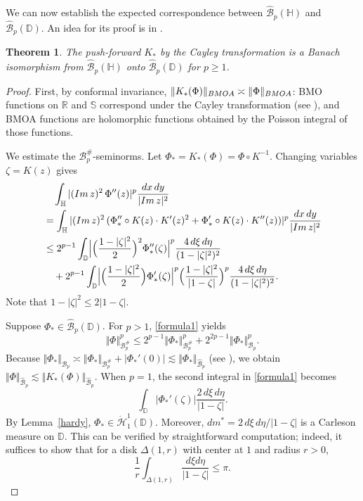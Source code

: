 \documentclass[amstex,12pt,reqno]{amsart}
\newtheorem{theorem}{Theorem}[section]
\theoremstyle{definition}
\begin{document}
We can now establish the expected correspondence between $\widehat{\mathcal B}_p(\mathbb H)$ and 
$\widehat{\mathcal B}_p(\mathbb D)$. An idea for its proof is in \cite[Section 9]{Pe}.

\begin{theorem}\label{isomorphism}
The push-forward $K_*$ by the Cayley transformation is a Banach isomorphism from $\widehat{\mathcal B}_p(\mathbb H)$ onto 
$\widehat{\mathcal B}_p(\mathbb D)$ for $p \geq 1$. 
\end{theorem}

\begin{proof}
First, by conformal invariance, $\Vert K_*(\Phi) \Vert_{\rm BMOA} \asymp \Vert \Phi \Vert_{\rm BMOA}$:
BMO functions on $\mathbb R$ and $\mathbb S$ correspond under the Cayley transformation
(see \cite[Corollary.~VI.1.3]{Ga}), and BMOA functions are holomorphic functions obtained by the Poisson integral of those functions.

We estimate the ${\mathcal B}_p^{\#}$-seminorms.
Let $\Phi_*=K_*(\Phi)=\Phi \circ K^{-1}$. Changing variables $\zeta=K(z)$ gives
\begin{align}\label{formula1}
& \quad \int_{\mathbb H} |({\rm Im}\,z)^2\, \Phi''(z)|^p \frac{dx\,dy}{|{\rm Im}\,z|^2} \\
&=\int_{\mathbb H} |({\rm Im}\,z)^2\,(\Phi_*''\circ K(z)\cdot K'(z)^2+\Phi_*'\circ K(z)\cdot K''(z))|^p \frac{dx\,dy}{|{\rm Im}\,z|^2} \notag \\
& \leq 2^{p-1}\int_{\mathbb D} \Bigl|\Bigl(\frac{1-|\zeta|^2}{2}\Bigr)^2\Phi_*''(\zeta)\Bigr|^p\frac{4\,d\xi\,d\eta}{(1-|\zeta|^2)^2} \notag\\
&\quad +2^{p-1}\int_{\mathbb D}\Bigl|\Bigl(\frac{1-|\zeta|^2}{2}\Bigr)\Phi_*'(\zeta)\Bigr|^p \Bigl(\frac{1-|\zeta|^2}{|1-\zeta|}\Bigr)^p
\frac{4\,d\xi\,d\eta}{(1-|\zeta|^2)^2}.
\end{align}
Note that $1-|\zeta|^2 \leq 2|1-\zeta|$.

Suppose $\Phi_*\in \widehat{\mathcal B}_p(\mathbb D)$. For $p>1$, \eqref{formula1} yields
$$
\Vert \Phi \Vert_{{\mathcal B}_p^{\#}}^p \leq 2^{p-1}\Vert \Phi_* \Vert_{{\mathcal B}_p^{\#}}^p
+2^{2p-1}\Vert \Phi_* \Vert_{{\mathcal B}_p}^p.
$$
Because $\Vert \Phi_* \Vert_{{\mathcal B}_p} \asymp \Vert \Phi_* \Vert_{{\mathcal B}_p^{\#}}+|\Phi_*'(0)| \lesssim \Vert \Phi_* \Vert_{\widehat{\mathcal B}_p}$ (see \cite[p.~327]{Zhu0}),
we obtain $\Vert \Phi \Vert_{\widehat{\mathcal B}_p} \lesssim \Vert K_*(\Phi) \Vert_{\widehat{\mathcal B}_p}$.
When $p=1$, the second integral in \eqref{formula1} becomes
\begin{equation}\label{formula2}
\int_{\mathbb D}|\Phi_*'(\zeta)| 
\frac{2\,d\xi\,d\eta}{|1-\zeta|}. 
\end{equation}
By Lemma~\ref{hardy}, $\Phi_*\in \dot{\mathcal H}^1_1(\mathbb D)$. Moreover,
$dm^*=2\,d\xi\,d\eta/|1-\zeta|$ is a Carleson measure on $\mathbb D$.
This can be verified by straightforward computation;
indeed, it suffices to show that for a disk $\Delta(1,r)$ with center at $1$ and radius $r>0$, 
$$
\frac{1}{r} \int_{\Delta(1,r)}\frac{d\xi d\eta}{|1-\zeta|} \leq \pi.
$$


\end{proof}
\end{document}
